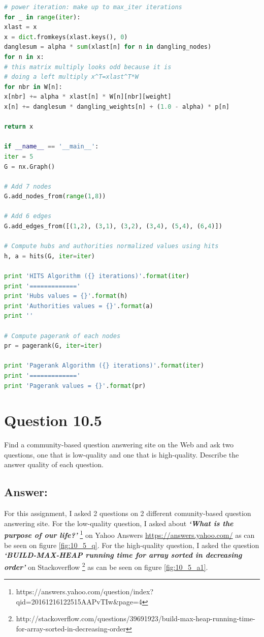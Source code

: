 \documentclass[letterpaper,11pt]{article}
\begin{document}
\begin{lstlisting}[language=python, caption={Computing HITS and PageRank}, label={lst:10_3.py}]
# power iteration: make up to max_iter iterations
for _ in range(iter):
xlast = x
x = dict.fromkeys(xlast.keys(), 0)
danglesum = alpha * sum(xlast[n] for n in dangling_nodes)
for n in x:
# this matrix multiply looks odd because it is
# doing a left multiply x^T=xlast^T*W
for nbr in W[n]:
x[nbr] += alpha * xlast[n] * W[n][nbr][weight]
x[n] += danglesum * dangling_weights[n] + (1.0 - alpha) * p[n]

return x

if __name__ == '__main__':
iter = 5
G = nx.Graph()

# Add 7 nodes
G.add_nodes_from(range(1,8))

# Add 6 edges
G.add_edges_from([(1,2), (3,1), (3,2), (3,4), (5,4), (6,4)])

# Compute hubs and authorities normalized values using hits
h, a = hits(G, iter=iter)

print 'HITS Algorithm ({} iterations)'.format(iter)
print '============='
print 'Hubs values = {}'.format(h)
print 'Authorities values = {}'.format(a)
print ''

# Compute pagerank of each nodes
pr = pagerank(G, iter=iter)

print 'Pagerank Algorithm ({} iterations)'.format(iter)
print '============='
print 'Pagerank values = {}'.format(pr)

\end{lstlisting}



\noindent\makebox[\linewidth]{\rule{\textwidth}{0.4pt}}

\section*{Question 10.5}
\begin{spverbatim}
Find a community-based question answering site on the Web and ask two questions, one that is low-quality and one that is high-quality. Describe the answer quality of each question.
\end{spverbatim}

\subsection*{Answer:}
For this assignment, I asked 2 questions on 2 different comunity-based question answering site. For the low-quality question, I asked about \textbf{\textit{`What is the purpose of our life?'}} \footnote{https://answers.yahoo.com/question/index?qid=20161216122515AAPvTIw&page=4} on Yahoo Answers \url{https://answers.yahoo.com/} as can be seen on figure \ref{fig:10_5_q}. For the high-quality question, I asked the question \textbf{\textit{`BUILD-MAX-HEAP running time for array sorted in decreasing order'}} on Stackoverflow \footnote{http://stackoverflow.com/questions/39691923/build-max-heap-running-time-for-array-sorted-in-decreasing-order} as can be seen on figure \ref{fig:10_5_a1}.
\end{document}

